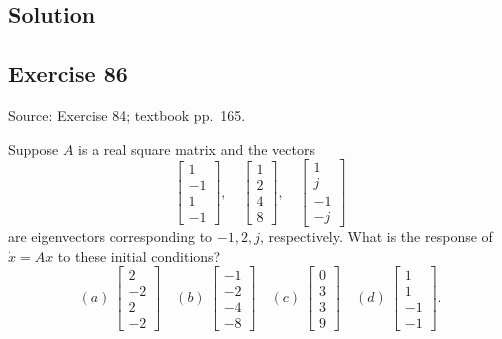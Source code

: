 \documentclass[12pt,a4paper]{article}
\newlength{\questionroom}
\newenvironment{questionprompt}{%
  \begin{lrbox}{\questionbox}\begin{minipage}{\linewidth}%
}{%
  \end{minipage}\end{lrbox}%
  \setlength{\questionroom}{\dimexpr\ht\questionbox+\dp\questionbox+5.2cm\relax}%
  \ifdim\questionroom>\textheight\setlength{\questionroom}{\textheight}\fi
  \Needspace{\questionroom}%
  \noindent\usebox{\questionbox}\par
}
\begin{document}
\subsection*{Solution}
\vspace{3.5cm}


\begin{questionprompt}
\section*{Exercise 86}
\label{practice:86}
{\small Source: Exercise 84; textbook pp.~165.}\par
Suppose $A$ is a real square matrix and the vectors
\[\begin{bmatrix}1\\-1\\1\\-1\end{bmatrix},\quad
\begin{bmatrix}1\\2\\4\\8\end{bmatrix},\quad
\begin{bmatrix}1\\j\\-1\\-j\end{bmatrix}\]
are eigenvectors corresponding to $-1,2,j$, respectively. What is the response of $\dot x=Ax$ to these initial conditions?
\[(a)\ \begin{bmatrix}2\\-2\\2\\-2\end{bmatrix}\quad
(b)\ \begin{bmatrix}-1\\-2\\-4\\-8\end{bmatrix}\quad
(c)\ \begin{bmatrix}0\\3\\3\\9\end{bmatrix}\quad
(d)\ \begin{bmatrix}1\\1\\-1\\-1\end{bmatrix}.\]
\end{questionprompt}
\end{document}
